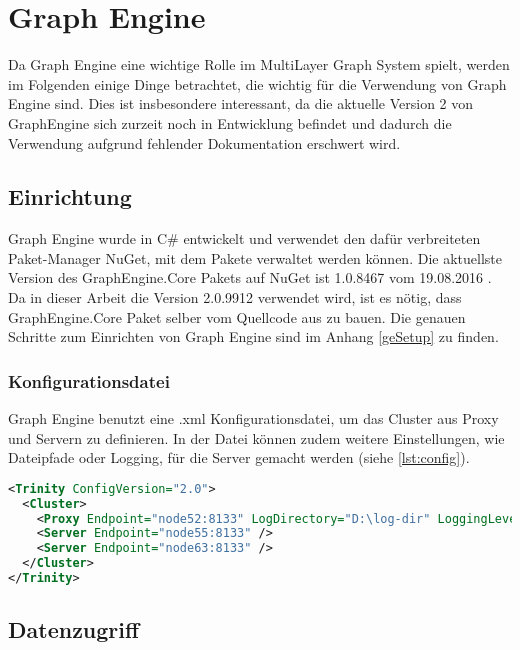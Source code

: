 \section{Graph Engine}

Da Graph Engine eine wichtige Rolle im MultiLayer Graph System spielt, werden im Folgenden einige Dinge betrachtet, die wichtig für die Verwendung von Graph Engine sind.
Dies ist insbesondere interessant, da die aktuelle Version 2 von GraphEngine sich zurzeit noch in Entwicklung befindet und dadurch die Verwendung aufgrund fehlender Dokumentation erschwert wird.


\subsection{Einrichtung}

Graph Engine wurde in C\# entwickelt und verwendet den dafür verbreiteten Paket-Manager NuGet, mit dem Pakete verwaltet werden können.
Die aktuellste Version des GraphEngine.Core Pakets auf NuGet ist 1.0.8467 vom 	19.08.2016 \cite{geVersion}. Da in dieser Arbeit die Version 2.0.9912 verwendet wird, ist es nötig, dass GraphEngine.Core Paket selber vom Quellcode aus zu bauen.
Die genauen Schritte zum Einrichten von Graph Engine sind im Anhang \ref{geSetup} zu finden.


\subsubsection{Konfigurationsdatei}

Graph Engine benutzt eine .xml Konfigurationsdatei, um das Cluster aus Proxy und Servern zu definieren.
In der Datei können zudem weitere Einstellungen, wie Dateipfade oder Logging, für die Server gemacht werden (siehe \ref{lst:config}).

\begin{lstlisting}[float, language=xml, label={lst:config}, caption={Beispiel Konfigurationsdatei für ein Cluster mit einer Proxy und zwei Servern}]
<Trinity ConfigVersion="2.0">
  <Cluster>
    <Proxy Endpoint="node52:8133" LogDirectory="D:\log-dir" LoggingLevel="Info" />  
    <Server Endpoint="node55:8133" />
    <Server Endpoint="node63:8133" />
  </Cluster>
</Trinity>
\end{lstlisting}


\subsection{Datenzugriff}
\label{datenzugriff}

